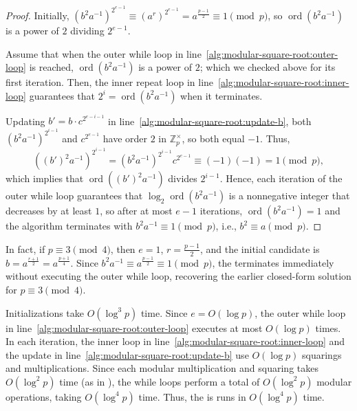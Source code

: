 \begin{proof}
    Initially, \((b^2 a^{-1})^{2^{e-1}} \equiv (a^r)^{2^{e-1}} = a^{\frac{p-1}{2}} \equiv 1 \pmod{p}\), so \(\operatorname{ord}(b^2 a^{-1})\) is a power of \(2\) dividing \(2^{e-1}\).

    Assume that when the outer while loop in line~\ref{alg:modular-square-root:outer-loop} is reached, \(\operatorname{ord}(b^2 a^{-1})\) is a power of \(2\); which we checked above for its first iteration.
    Then, the inner repeat loop in line~\ref{alg:modular-square-root:inner-loop} guarantees that \(2^i = \operatorname{ord}(b^2 a^{-1})\) when it terminates.

    Updating \(b' = b \cdot c^{2^{e-i-1}}\) in line~\ref{alg:modular-square-root:update-b}, both \((b^2 a^{-1})^{2^{i-1}}\) and \(c^{2^{e-1}}\) have order \(2\) in \(\mathbb{Z}_p^\times\), so both equal \(-1\). Thus,
    \[
        ((b')^2 a^{-1})^{2^{i-1}} = (b^2 a^{-1})^{2^{i-1}} c^{2^{e-1}} \equiv (-1)(-1) = 1 \pmod{p},
    \]
    which implies that \(\operatorname{ord}((b')^2 a^{-1})\) divides \(2^{i-1}\).
    Hence, each iteration of the outer while loop guarantees that \(\log_2 \operatorname{ord}(b^2 a^{-1})\) is a nonnegative integer that decreases by at least \(1\), so after at most \(e - 1\) iterations, \(\operatorname{ord}(b^2 a^{-1}) = 1\) and the algorithm terminates with \(b^2 a^{-1} \equiv 1 \pmod{p}\), i.e., \(b^2 \equiv a \pmod{p}\).
\end{proof}

In fact, if \(p \equiv 3 \pmod{4}\), then \(e = 1\), \(r = \frac{p-1}{2}\), and the initial candidate is \(b = a^{\frac{r+1}{2}} = a^{\frac{p+1}{4}}\).
Since \(b^2 a^{-1} \equiv a^{\frac{p-1}{2}} \equiv 1 \pmod{p}\), the  terminates immediately without executing the outer while loop, recovering the earlier closed-form solution for \(p \equiv 3 \pmod{4}\).

\begin{remark}
    Initializations take \(O(\log^3 p)\) time.
    Since \(e = O(\log p)\), the outer while loop in line~\ref{alg:modular-square-root:outer-loop} executes at most \(O(\log p)\) times.
    In each iteration, the inner loop in line~\ref{alg:modular-square-root:inner-loop} and the update in line~\ref{alg:modular-square-root:update-b} use \(O(\log p)\) squarings and multiplications.
    Since each modular multiplication and squaring takes \(O(\log^2 p)\) time (as in ), the while loops perform a total of \(O(\log^2 p)\) modular operations, taking \(O(\log^4 p)\) time.
    Thus, the  is runs in \(O(\log^4 p)\) time.
\end{remark}

